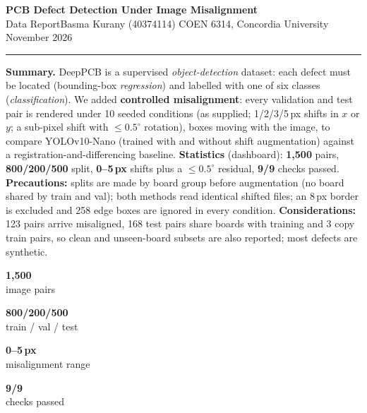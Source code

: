 \documentclass[10pt,a4paper]{article}
\newcommand{\kpi}[2]{%
  \begin{tcolorbox}[colback=tile,colframe=tile,arc=2pt,boxrule=0pt,left=1pt,right=1pt,top=2pt,bottom=2pt,
                    width=\linewidth,height=1.15cm,valign=center,halign=center]
  {\large\bfseries\color{accent}#1}\\[1pt]{\scriptsize\color{muted}#2}
  \end{tcolorbox}}
\begin{document}
{\LARGE\bfseries PCB Defect Detection Under Image Misalignment}\\[1pt]
{\large Data Report}\hfill{\small Basma Kurany (40374114) \textperiodcentered{} COEN 6314, Concordia University
\textperiodcentered{} November 2026}\\[-5pt]
{\color{accent}\rule{\linewidth}{0.8pt}}

\textbf{Summary.} DeepPCB is a supervised \emph{object-detection} dataset: each defect must be located
(bounding-box \emph{regression}) and labelled with one of six classes (\emph{classification}). We added
\textbf{controlled misalignment}: every validation and test pair is rendered under 10 seeded conditions (as
supplied; 1/2/3/5\,px shifts in $x$ or $y$; a sub-pixel shift with $\leq0.5^\circ$ rotation), boxes moving with the
image, to compare YOLOv10-Nano (trained with and without shift augmentation) against a registration-and-differencing
baseline. \textbf{Statistics} (dashboard): \textbf{1,500} pairs, \textbf{800/200/500} split, \textbf{0--5\,px}
shifts plus a $\leq0.5^\circ$ residual, \textbf{9/9} checks passed.
\textbf{Precautions:} splits are made by board group before augmentation (no board shared by train and val); both
methods read identical shifted files; an 8\,px border is excluded and 258 edge boxes are ignored in every condition.
\textbf{Considerations:} 123 pairs arrive misaligned, 168 test pairs share boards with training and 3 copy train
pairs, so clean and unseen-board subsets are also reported; most defects are synthetic.

\vspace{1pt}\noindent
\begin{minipage}[t]{0.235\linewidth}\kpi{1,500}{image pairs}\end{minipage}\hfill
\begin{minipage}[t]{0.235\linewidth}\kpi{800/200/500}{train / val / test}\end{minipage}\hfill
\begin{minipage}[t]{0.235\linewidth}\kpi{0--5\,px}{misalignment range}\end{minipage}\hfill
\begin{minipage}[t]{0.235\linewidth}\kpi{9/9}{checks passed}\end{minipage}
\end{document}
